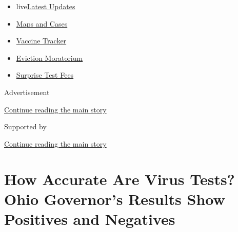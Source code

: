\begin{itemize}
\tightlist
\item
  live\href{https://www.nytimes3xbfgragh.onion/2020/09/09/world/covid-19-coronavirus.html?name=styln-coronavirus-national\&region=TOP_BANNER\&block=storyline_menu_recirc\&action=click\&pgtype=Article\&impression_id=55a8bd71-f2d1-11ea-8405-8513584d3c2d\&variant=undefined}{Latest
  Updates}
\item
  \href{https://www.nytimes3xbfgragh.onion/interactive/2020/us/coronavirus-us-cases.html?name=styln-coronavirus-national\&region=TOP_BANNER\&block=storyline_menu_recirc\&action=click\&pgtype=Article\&impression_id=55a8e480-f2d1-11ea-8405-8513584d3c2d\&variant=undefined}{Maps
  and Cases}
\item
  \href{https://www.nytimes3xbfgragh.onion/interactive/2020/science/coronavirus-vaccine-tracker.html?name=styln-coronavirus-national\&region=TOP_BANNER\&block=storyline_menu_recirc\&action=click\&pgtype=Article\&impression_id=55a8e481-f2d1-11ea-8405-8513584d3c2d\&variant=undefined}{Vaccine
  Tracker}
\item
  \href{https://www.nytimes3xbfgragh.onion/2020/09/02/your-money/eviction-moratorium-covid.html?name=styln-coronavirus-national\&region=TOP_BANNER\&block=storyline_menu_recirc\&action=click\&pgtype=Article\&impression_id=55a8e482-f2d1-11ea-8405-8513584d3c2d\&variant=undefined}{Eviction
  Moratorium}
\item
  \href{https://www.nytimes3xbfgragh.onion/2020/09/09/upshot/coronavirus-surprise-test-fees.html?name=styln-coronavirus-national\&region=TOP_BANNER\&block=storyline_menu_recirc\&action=click\&pgtype=Article\&impression_id=55a8e483-f2d1-11ea-8405-8513584d3c2d\&variant=undefined}{Surprise
  Test Fees}
\end{itemize}

Advertisement

\protect\hyperlink{after-top}{Continue reading the main story}

Supported by

\protect\hyperlink{after-sponsor}{Continue reading the main story}

\hypertarget{how-accurate-are-virus-tests-ohio-governors-results-show-positives-and-negatives}{%
\section{How Accurate Are Virus Tests? Ohio Governor's Results Show
Positives and
Negatives}\label{how-accurate-are-virus-tests-ohio-governors-results-show-positives-and-negatives}}

